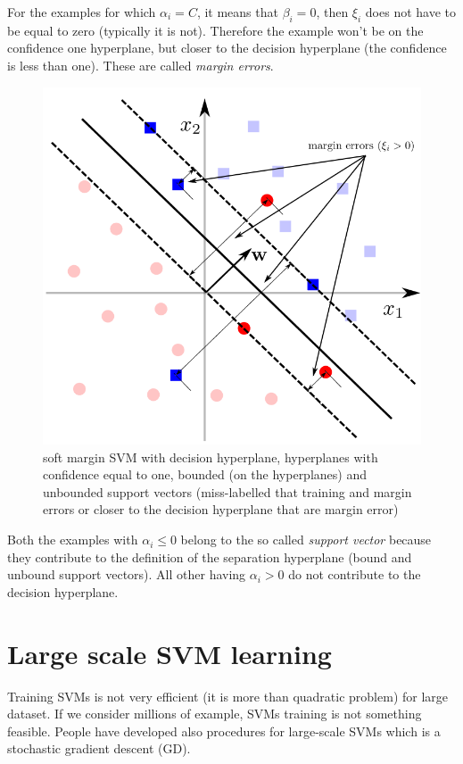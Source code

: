     For the examples for which $\alpha_i = C$, it means that $\beta_i = 0$, then $\xi_i$ does not have to be equal to zero (typically it is not). Therefore the example won't be on the confidence one hyperplane, but closer to the decision hyperplane (the confidence is less than one). 
    These are called \textit{margin errors}.\\
    \begin{figure}
        \centering
        \includegraphics[scale=0.35]{images/soft_margin_SVM.png}
        \caption{soft margin SVM with decision hyperplane, hyperplanes with confidence equal to one, bounded (on the hyperplanes) and unbounded support vectors (miss-labelled that training and margin errors or closer to the decision hyperplane that are margin error)}
        \label{fig:SVM_soft}
    \end{figure}

    Both the examples with $\alpha_i \leq 0$ belong to the so called \textit{support vector} because they contribute to the definition of the separation hyperplane (bound and unbound support vectors).  
    All other having $\alpha_i > 0$ do not contribute to the decision hyperplane. 

\section{Large scale SVM learning}
    Training SVMs is not very efficient (it is more than quadratic problem) for large dataset. If we consider millions of example, SVMs training is not something feasible. 
    People have developed also procedures for large-scale SVMs which is a stochastic gradient descent (GD).\\

